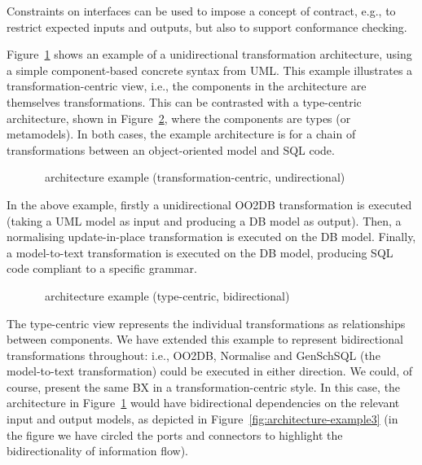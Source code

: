 Constraints on interfaces can be used to impose a concept of contract, e.g., to restrict expected inputs and outputs, but also to support conformance checking.

Figure~\ref{fig:architecture-example1} shows an example of a unidirectional transformation architecture, using a simple component-based concrete syntax from UML. This example illustrates a transformation-centric view, i.e., the components in the architecture are themselves transformations. This can be contrasted with a type-centric architecture, shown in Figure~\ref{fig:architecture-example2}, where the components are types (or metamodels). In both cases, the example architecture is for a chain of transformations between an object-oriented model and SQL code.

\begin{figure}[htbp]
\caption{\transml\ architecture example (transformation-centric, undirectional)}
\label{fig:architecture-example1}
\end{figure}

In the above example, firstly a unidirectional OO2DB transformation is executed (taking a UML model as input and producing a DB model as output). Then, a normalising update-in-place transformation is executed on the DB model. Finally, a model-to-text transformation is executed on the DB model, producing SQL code compliant to a specific grammar.

\begin{figure}[htbp]
\caption{\transml\ architecture example (type-centric, bidirectional)}
\label{fig:architecture-example2}
\end{figure}

The type-centric view represents the individual transformations as relationships between components. We have extended this example to represent bidirectional transformations throughout: i.e., OO2DB, Normalise and GenSchSQL (the model-to-text transformation) could be executed in either direction.  We could, of course, present the same BX in a transformation-centric style. In this case, the architecture in Figure~\ref{fig:architecture-example1} would have bidirectional dependencies on the relevant input and output models, as depicted 
in Figure~\ref{fig:architecture-example3} (in the figure we have circled the ports and connectors to highlight the bidirectionality of information flow).

